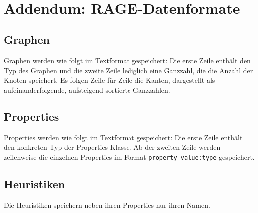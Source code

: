 \documentclass{article}
\begin{document}
	
	
	~\newpage
	\section{Addendum: RAGE-Datenformate}
	\subsection{Graphen}
	Graphen werden wie folgt im Textformat gespeichert: \newline
	Die erste Zeile enthält den Typ des Graphen und die zweite Zeile lediglich eine Ganzzahl, die die Anzahl der Knoten speichert. Es folgen Zeile für Zeile die Kanten, dargestellt als aufeinanderfolgende, aufsteigend sortierte Ganzzahlen.
	
	\subsection{Properties}
	Properties werden wie folgt im Textformat gespeichert: \newline
	Die erste Zeile enthält den konkreten Typ der Properties-Klasse. Ab der zweiten Zeile werden zeilenweise die einzelnen Properties im Format \texttt{property value:type} gespeichert.
	
	\subsection{Heuristiken}
	Die Heuristiken speichern neben ihren Properties nur ihren Namen.
	
\end{document}

